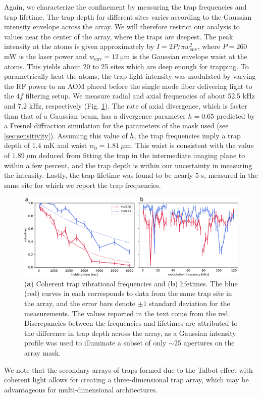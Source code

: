 Again, we characterize the confinement by measuring the trap frequencies and trap lifetime. The trap depth for different sites varies according to the Gaussian intensity envelope across the array. We will therefore restrict our analysis to values near the center of the array, where the traps are deepest. The peak intensity at the atoms is given approximately by $I = 2P/\pi w_{\text{env}}^2$, where $P=260$ mW is the laser power and $w_{\text {env}}=12~\mathrm{ \mu m}$ is the Gaussian envelope waist at the atoms. This yields about 20 to 25 sites which are deep enough for trapping. To parametrically heat the atoms, the trap light intensity was modulated by varying the RF power to an AOM placed before the single mode fiber delivering light to the $4f$ filtering setup. We measure radial and axial frequencies of about 52.5 kHz and 7.2 kHz, respectively (Fig. \ref{fig:coherent_frequencies_and_lifetime}). The rate of axial divergence, which is faster than that of a Gaussian beam, has a divergence parameter $h=0.65$ predicted by a Fresnel diffraction simulation for the parameters of the mask used (see \ref{sec:sensitivity}). Assuming this value of $h$, the trap frequencies imply a trap depth of $1.4$ mK and waist $w_0=1.81~\mu$m. This waist is consistent with the value of $1.89~\mu$m deduced from fitting the trap in the intermediate imaging plane to within a few percent, and the trap depth is within our uncertainty in measuring the intensity. Lastly, the trap lifetime was found to be nearly 5 s, measured in the same site for which we report the trap frequencies.

\begin{figure}[h]
    \centering
    \includegraphics[width=\textwidth]{Images/coherent_trap_lifetime_and_resonances.pdf}
    \caption{(\textbf{a}) Coherent trap vibrational frequencies and (\textbf{b}) lifetimes. The blue (red) curves in each corresponds to data from the same trap site in the array, and the error bars denote $\pm1$ standard deviation for the measurements. The values reported in the text come from the red. Discrepancies between the frequencies and lifetimes are attributed to the difference in trap depth across the array, as a Gaussian intensity profile was used to illuminate a subset of only $\sim$25 apertures on the array mask.}
    \label{fig:coherent_frequencies_and_lifetime}
\end{figure}
We note that the secondary arrays of traps formed due to the Talbot effect with coherent light allows for creating a three-dimensional trap array, which may be advantageous for multi-dimensional architectures\cite{YWang2016,Barredo2018}.

